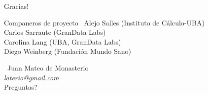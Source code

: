 \documentclass[xcolor=x11names]{beamer}
\begin{document}










\begin{frame}{Gracias! }
			\begin{block}{Companeros de proyecto}
					\center\
					Alejo Salles (Instituto de Cálculo-UBA) \\
					Carlos Sarraute (GranData Labs) \\
					Carolina Lang (UBA, GranData Labs) \\
					 Diego Weinberg (Fundación Mundo Sano) \\
	\end{block}
		
				\center\
				Juan Mateo de Monasterio \\
				\textit{laterio@gmail.com} \\
				Preguntas? \\

\end{frame}




\justifying%
% 
% 


\vfill
\end{document}
